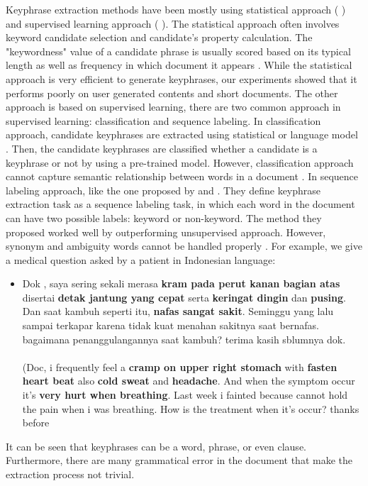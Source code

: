 Keyphrase extraction methods have been mostly using statistical approach (\cite{sparck1972statistical} \cite{zhang2007comparative} \cite{rake} \cite{mihalcea2004textrank}) and supervised learning approach (\cite{witten1999kea} \cite{medelyan2009human} \cite{marujoMAUI}). The statistical approach often involves keyword candidate selection and candidate's property calculation. The "keywordness" value of a candidate phrase is usually scored based on its typical length as well as frequency in which document it appears \cite{rake}. While the statistical approach is very efficient to generate keyphrases, our experiments showed that it performs poorly on user generated contents and short documents. The other approach is based on supervised learning, there are two common approach in supervised learning: classification and sequence labeling. In classification approach, candidate keyphrases are extracted using statistical \cite{sparck1972statistical} or language model \cite{ekpNeuralNetworks}. Then, the candidate keyphrases are classified whether a candidate is a keyphrase or not by using a pre-trained model. However, classification approach cannot capture semantic relationship between words in a document \cite{surveyPopulerTerbaruEkp}.  In sequence labeling approach,  like the one proposed by \cite{cao2010automatically} and \cite{zhang2008automatic}. They define keyphrase extraction task as a sequence labeling task, in which each word in the document can have two possible labels: keyword or non-keyword. The method they proposed worked well by outperforming unsupervised approach. However, synonym and ambiguity words cannot be handled properly \cite{zhang2008automatic}. For example, we give a medical question asked by a patient in Indonesian language:
\begin{itemize}
    \item 
		Dok , saya sering sekali merasa \textbf{kram pada perut kanan bagian atas} disertai \textbf{detak jantung yang cepat} serta \textbf{keringat dingin} dan \textbf{pusing}. Dan saat kambuh seperti itu, \textbf{nafas sangat sakit}. Seminggu yang lalu sampai terkapar karena tidak kuat menahan sakitnya saat bernafas. bagaimana penanggulangannya saat kambuh? terima kasih sblumnya dok. \\\\
		(Doc, i frequently feel a \textbf{cramp on upper right stomach} with \textbf{fasten heart beat} also \textbf{cold sweat} and \textbf{headache}. And when the symptom occur it's \textbf{very hurt when breathing}. Last week i fainted because cannot hold the pain when i was breathing. How is the treatment when it's occur? thanks before \\
\end{itemize}
It can be seen that keyphrases can be a word, phrase, or even clause. Furthermore, there are many grammatical error in the document that make the extraction process not trivial.

